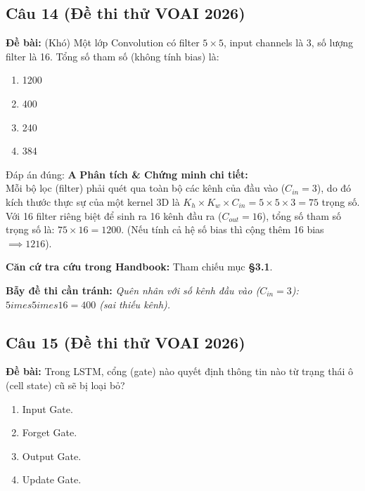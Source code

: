 \documentclass[10pt,a4paper]{article}
\begin{document}
\subsection*{Câu 14 (Đề thi thử VOAI 2026)}
\textbf{Đề bài:} (Khó) Một lớp Convolution có filter $5 \times 5$, input channels là 3, số lượng filter là 16. Tổng số tham số (không tính bias) là:

\begin{enumerate}[label=\textbf{\Alph*.}]
    \item 1200
    \item 400
    \item 240
    \item 384
\end{enumerate}

\begin{solbox}{Đáp án đúng: \textbf{A}}
\textbf{Phân tích \& Chứng minh chi tiết:} \\
Mỗi bộ lọc (filter) phải quét qua toàn bộ các kênh của đầu vào ($C_{in} = 3$), do đó kích thước thực sự của một kernel 3D là $K_h \times K_w \times C_{in} = 5 \times 5 \times 3 = 75$ trọng số. Với 16 filter riêng biệt để sinh ra 16 kênh đầu ra ($C_{out} = 16$), tổng số tham số trọng số là: $75 \times 16 = 1200$. (Nếu tính cả hệ số bias thì cộng thêm 16 bias $\implies 1216$).

\vspace{0.4em}
\textbf{Căn cứ tra cứu trong Handbook:} Tham chiếu mục \textbf{§3.1}.

\vspace{0.4em}
\textbf{Bẫy đề thi cần tránh:} \textit{Quên nhân với số kênh đầu vào ($C_{in} = 3$): $5 	imes 5 	imes 16 = 400$ (sai thiếu kênh).}
\end{solbox}
\vspace{0.5em}


\subsection*{Câu 15 (Đề thi thử VOAI 2026)}
\textbf{Đề bài:} Trong LSTM, cổng (gate) nào quyết định thông tin nào từ trạng thái ô (cell state) cũ sẽ bị loại bỏ?

\begin{enumerate}[label=\textbf{\Alph*.}]
    \item Input Gate.
    \item Forget Gate.
    \item Output Gate.
    \item Update Gate.
\end{enumerate}
\end{document}
